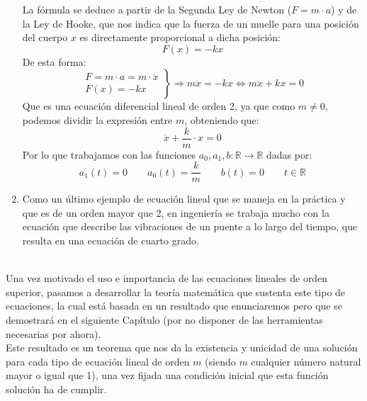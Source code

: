 \begin{ejemplo}
\begin{enumerate}
            La fórmula se deduce a partir de la Segunda Ley de Newton ($F=m\cdot a$) y de la Ley de Hooke, que nos indica que la fuerza de un muelle para una posición del cuerpo $x$ es directamente proporcional a dicha posición:
            \begin{equation*}
                F(x) = -kx
            \end{equation*}
            De esta forma:
            \begin{equation*}
                \left.\begin{array}{rl}
                    F = m\cdot a = m\cdot \ddot{x} \\
                    F(x) = -kx
            \end{array}\right\} \Longrightarrow m\ddot{x} = -kx \Longleftrightarrow m\ddot{x} + kx = 0
            \end{equation*}
            Que es una ecuación diferencial lineal de orden 2, ya que como $m\neq 0$, podemos dividir la expresión entre $m$, obteniendo que:
            \begin{equation*}
                \ddot{x} + \dfrac{k}{m}\cdot x = 0
            \end{equation*}
            Por lo que trabajamos con las funciones $a_0,a_1,b:\mathbb{R}\rightarrow\mathbb{R}$ dadas por:
            \begin{equation*}
                a_1(t) = 0 \qquad a_0(t) = \dfrac{k}{m} \qquad b(t) = 0 \qquad t\in \mathbb{R}
            \end{equation*}
        \item Como un último ejemplo de ecuación lineal que se maneja en la práctica y que es de un orden mayor que 2, en ingeniería se trabaja mucho con la ecuación que describe las vibraciones de un puente a lo largo del tiempo, que resulta en una ecuación de cuarto grado.
    \end{enumerate}
\end{ejemplo}~\\

Una vez motivado el uso e importancia de las ecuaciones lineales de orden superior, pasamos a desarrollar la teoría matemática que sustenta este tipo de ecuaciones, la cual está basada en un resultado que enunciaremos pero que se demostrará en el siguiente Capítulo (por no disponer de las herramientas necesarias por ahora).\\

Este resultado es un teorema que nos da la existencia y unicidad de una solución para cada tipo de ecuación lineal de orden $m$ (siendo $m$ cualquier número natural mayor o igual que 1), una vez fijada una condición inicial que esta función solución ha de cumplir.

